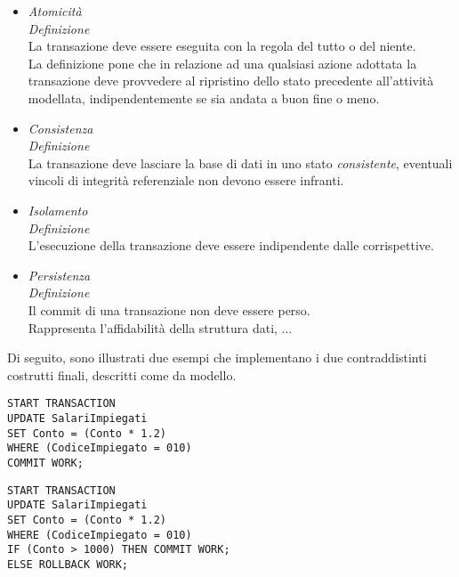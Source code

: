 \documentclass{article}
\begin{document}
\begin{itemize}[label={-}]
    \itemsep0em
    \item \textit{Atomicità}\vspace*{7pt}\\ \textit{Definizione}\\La transazione deve essere eseguita con la regola del tutto o del niente.\vspace*{7pt}\\ La definizione pone che in relazione ad una qualsiasi azione adottata la transazione deve provvedere al ripristino dello stato precedente all'attività modellata, indipendentemente se sia andata a buon fine o meno.
    \item \textit{Consistenza}\vspace*{7pt}\\ \textit{Definizione}\\La transazione deve lasciare la base di dati in uno stato \textit{consistente}, eventuali vincoli di integrità referenziale non devono essere infranti.
    \item \textit{Isolamento}\vspace*{7pt}\\ \textit{Definizione}\\L'esecuzione della transazione deve essere indipendente dalle corrispettive.
    \item \textit{Persistenza}\vspace*{7pt}\\ \textit{Definizione}\\Il commit di una transazione non deve essere perso.\vspace*{14pt}\\Rappresenta l'affidabilità della struttura dati, ... 
\end{itemize}
Di seguito, sono illustrati due esempi che implementano i due contraddistinti costrutti finali, descritti come da modello.\vspace*{14pt}\\
\begin{minipage}{\textwidth}
    \begin{lstlisting}
START TRANSACTION
UPDATE SalariImpiegati
SET Conto = (Conto * 1.2)
WHERE (CodiceImpiegato = 010)
COMMIT WORK;
    \end{lstlisting}
\end{minipage}\vspace*{14pt}
\begin{minipage}{\textwidth}
    \begin{lstlisting}
START TRANSACTION
UPDATE SalariImpiegati
SET Conto = (Conto * 1.2)
WHERE (CodiceImpiegato = 010)
IF (Conto > 1000) THEN COMMIT WORK;
ELSE ROLLBACK WORK;
    \end{lstlisting}
\end{minipage}\vspace*{14pt}
\end{document}

